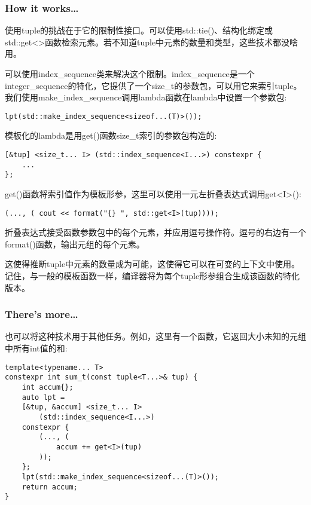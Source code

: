 \subsubsection{How it works…}

使用tuple的挑战在于它的限制性接口。可以使用std::tie()、结构化绑定或std::get<>函数检索元素。若不知道tuple中元素的数量和类型，这些技术都没啥用。

可以使用index\_sequence类来解决这个限制。index\_sequence是一个integer\_sequence的特化，它提供了一个size\_t的参数包，可以用它来索引tuple。我们使用make\_index\_sequence调用lambda函数在lambda中设置一个参数包:

\begin{lstlisting}[style=styleCXX]
lpt(std::make_index_sequence<sizeof...(T)>());
\end{lstlisting}

模板化的lambda是用get()函数size\_t索引的参数包构造的:

\begin{lstlisting}[style=styleCXX]
[&tup] <size_t... I> (std::index_sequence<I...>) constexpr {
	...
};
\end{lstlisting}

get()函数将索引值作为模板形参，这里可以使用一元左折叠表达式调用get<I>():

\begin{lstlisting}[style=styleCXX]
(..., ( cout << format("{} ", std::get<I>(tup))));
\end{lstlisting}

折叠表达式接受函数参数包中的每个元素，并应用逗号操作符。逗号的右边有一个format()函数，输出元组的每个元素。

这使得推断tuple中元素的数量成为可能，这使得它可以在可变的上下文中使用。记住，与一般的模板函数一样，编译器将为每个tuple形参组合生成该函数的特化版本。


\subsubsection{There's more…}

也可以将这种技术用于其他任务。例如，这里有一个函数，它返回大小未知的元组中所有int值的和:

\begin{lstlisting}[style=styleCXX]
template<typename... T>
constexpr int sum_t(const tuple<T...>& tup) {
	int accum{};
	auto lpt =
	[&tup, &accum] <size_t... I>
		(std::index_sequence<I...>)
	constexpr {
		(..., (
			accum += get<I>(tup)
		));
	};
	lpt(std::make_index_sequence<sizeof...(T)>());
	return accum;
}
\end{lstlisting}

